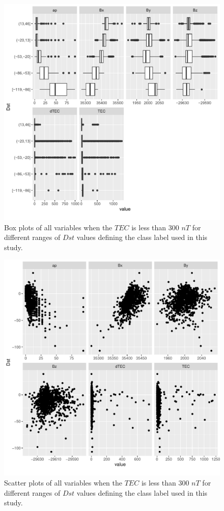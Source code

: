 \documentclass[sn-mathphys-num]{sn-jnl}%
\begin{document}
\begin{figure}
    \centering
    \includegraphics[width=0.9\linewidth]{iono3boxplot_fix.pdf}
    \caption{Box plots of all variables when the $TEC$ is less than $300$ $nT$ for different ranges of $Dst$ values defining the class label used in this study.}
    \label{fig:iono3boxplot}
\end{figure}

\begin{figure}
    \centering
    \includegraphics[width=0.9\linewidth]{iono3scatterplot.pdf}
    \caption{Scatter plots of all variables when the $TEC$ is less than $300$ $nT$ for different ranges of $Dst$ values defining the class label used in this study.}
    \label{fig:iono3scatterplot}
\end{figure}
\end{document}
